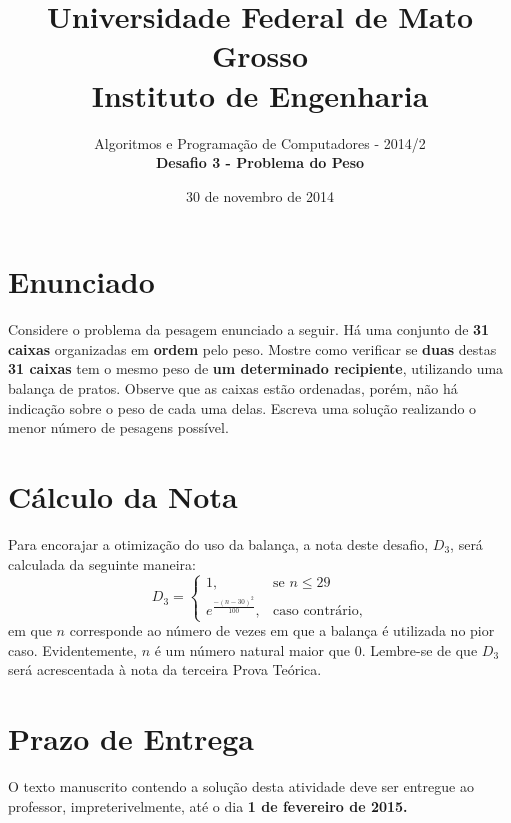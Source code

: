 \documentclass[12pt]{article}
\begin{document}
 
 
\title{Universidade Federal de Mato Grosso\\
Instituto de Engenharia}




\author{Algoritmos e Programa\c{c}\~ao de Computadores - 2014/2 \\
{\bf Desafio 3 - Problema do Peso}} %
\date{30 de novembro de 2014}
\maketitle


\section{Enunciado}
Considere o problema da pesagem enunciado a seguir. 
H\'a uma conjunto de {\bf 31 caixas} organizadas em {\bf ordem} pelo peso. Mostre como verificar se {\bf duas} destas {\bf 31 caixas} tem o mesmo peso de {\bf um determinado recipiente}, utilizando uma balan\c{c}a de pratos. Observe que as caixas est\~ao ordenadas, por\'em, n\~ao h\'a indica\c{c}\~ao sobre o peso de cada uma delas. Escreva uma solu\c{c}\~ao realizando o menor n\'umero de pesagens poss\'ivel.


\section{C\'alculo da Nota}
Para encorajar a otimiza\c{c}\~ao do uso da balan\c{c}a, a nota deste desafio, $D_3$, ser\'a calculada da seguinte maneira:
\begin{equation}
D_3 = \begin{cases} 1, & \mbox{se } n \leq 29 \\ e^{\frac{-(n-30)^2}{100}}, & \mbox{caso contr\'ario,}  \end{cases}%
\end{equation}
em que $n$ corresponde ao n\'umero de vezes em que a balan\c{c}a \'e utilizada no pior caso. Evidentemente, $n$ \'e um n\'umero natural maior que $0$. Lembre-se de que $D_3$ ser\'a acrescentada \`a nota da terceira Prova Te\'orica.


\section{Prazo de Entrega}

O texto manuscrito contendo a solu\c{c}\~ao desta atividade deve ser entregue ao professor, impreteri\-vel\-mente, at\'e o dia {\bf 1 de fevereiro de 2015.}
\end{document}
